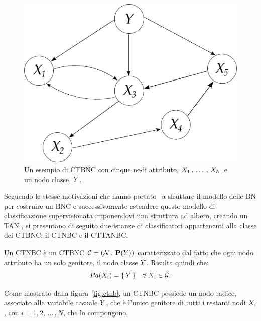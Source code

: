 \begin{figure}
\centering
\includegraphics[width=0.9\columnwidth]{immagini/ctbnc}
\caption[Un esempio di \acs{CTBNC}]{Un esempio di \acf{CTBNC} con cinque nodi attributo, $\mathnormal{X}_1\,,\,\dotsc\,,\,\mathnormal{X}_5$, e un nodo classe, $\mathnormal{Y}$.}
\label{fig:ctbnc-example}
\end{figure}

Seguendo le stesse motivazioni che hanno portato~\citet{Friedman1997} a sfruttare il modello delle \acl{BN} per costruire un \acf{BNC} e successivamente estendere questo modello di classificazione supervisionata imponendovi una struttura ad albero, creando un \acf{TAN} \class{}, si presentano di seguito due istanze di classificatori appartenenti alla classe dei \acf{CTBNC}: il \acf{CTNBC} e il \acf{CTTANBC}.

\begin{definizione}\label{defn:ctnbc}
Un \acf{CTNBC} è un \acl{CTBNC} $\mathcal{C}=(\mathcal{N}\,,\,\mathbf{P}(\mathnormal{Y}))$ caratterizzato dal fatto che ogni nodo attributo ha un solo genitore, il nodo classe $\mathnormal{Y}$. Risulta quindi che:
\[
Pa(\mathnormal{X}_i)=\{\,\mathnormal{Y}\,\} \quad \forall \; \mathnormal{X}_i \in \mathcal{G}\text{.}
\]
\end{definizione}
Come mostrato dalla figura~\vref{fig:ctnb}, un \acs{CTNBC} possiede un nodo radice, associato alla variabile casuale $\mathnormal{Y}$, che è l'unico genitore di tutti i restanti nodi $\mathnormal{X}_i$, con $i=1,2,\,\dotsc\,,N$, che lo compongono.

